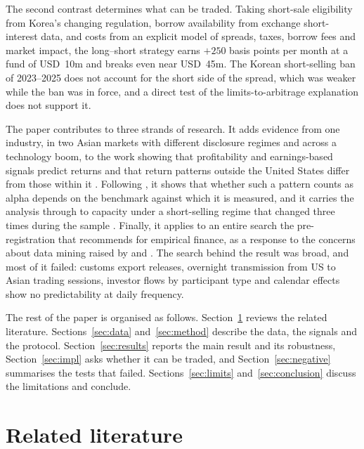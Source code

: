 \documentclass[12pt,a4paper]{article}
\begin{document}
The second contrast determines what can be traded. Taking short-sale eligibility from Korea's changing regulation,
borrow availability from exchange short-interest data, and costs from an explicit model of spreads, taxes, borrow fees
and market impact, the long--short strategy earns $+250$ basis points per month at a fund of USD~10m and breaks even
near USD~45m. The Korean short-selling ban of 2023--2025 does not account for the short side of the spread, which was
weaker while the ban was in force, and a direct test of the limits-to-arbitrage explanation does not support it.

The paper contributes to three strands of research. It adds evidence from one industry, in two Asian markets with
different disclosure regimes and across a technology boom, to the work showing that profitability and earnings-based
signals predict returns \citep{novymarx2013,famafrench2015,asness2019,chanjegadeeshlakonishok1996} and that return
patterns outside the United States differ from those within it \citep{rouwenhorst1999,famafrench2012,houkarolyikho2011}.
Following \citet{moskowitzgrinblatt1999}, it shows that whether such a pattern counts as alpha depends on the benchmark
against which it is measured, and it carries the analysis through to capacity under a short-selling regime that
changed three times during the sample \citep{miller1977,beberpagano2013}. Finally, it applies to an entire search the
pre-registration that \citet{harvey2017} recommends for empirical finance, as a response to the concerns about
data mining raised by \citet{harvey2016} and \citet{mcleanpontiff2016}. The search behind the result was broad, and
most of it failed: customs export releases, overnight transmission from US to Asian trading sessions, investor flows
by participant type and calendar effects show no predictability at daily frequency.

The rest of the paper is organised as follows. Section~\ref{sec:lit} reviews the related literature.
Sections~\ref{sec:data} and~\ref{sec:method} describe the data, the signals and the protocol. Section~\ref{sec:results}
reports the main result and its robustness, Section~\ref{sec:impl} asks whether it can be traded, and
Section~\ref{sec:negative} summarises the tests that failed. Sections~\ref{sec:limits} and~\ref{sec:conclusion} discuss
the limitations and conclude.

\section{Related literature}\label{sec:lit}
\end{document}
